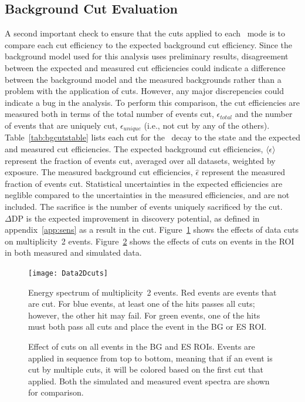 \documentclass[/main.tex]{subfiles}
\begin{document}
\subsection{Background Cut Evaluation}
A second important check to ensure that the cuts applied to each \bbes\ mode is to compare each cut efficiency to the expected background cut efficiency.
Since the background model used for this analysis uses preliminary results, disagreement between the expected and measured cut efficiencies could indicate a difference between the background model and the measured backgrounds rather than a problem with the application of cuts.
However, any major discrepencies could indicate a bug in the analysis.
To perform this comparison, the cut efficiencies are measured both in terms of the total number of events cut, $\epsilon_{total}$ and the number of events that are uniquely cut, $\epsilon_{unique}$ (i.e., not cut by any of the others).
Table~\ref{tab:bgcutstable} lists each cut for the \bbes\ decay to the  state and the expected and measured cut efficiencies.
The expected background cut efficiencies, $\langle\epsilon\rangle$ represent the fraction of events cut, averaged over all datasets, weighted by exposure.
The measured background cut efficiencies, $\hat{\epsilon}$ represent the measured fraction of events cut.
Statistical uncertainties in the expected efficiencies are neglible compared to the uncertainties in the measured efficiencies, and are not included.
The sacrifice is the number of events uniquely sacrificed by the cut.
$\Delta \mathrm{DP}$ is the expected improvement in discovery potential, as defined in appendix~\ref{app:sens} as a result in the cut.
Figure~\ref{fig:datacuts2D} shows the effects of data cuts on multiplicity~2 events.
Figure~\ref{fig:cutsroi} shows the effects of cuts on events in the ROI in both measured and simulated data.

\begin{figure}
  \centering
  \texttt{[image: Data2Dcuts]}
  \caption[Effect of data cuts on measured multiplicity 2 events]{\label{fig:datacuts2D}
    Energy spectrum of multiplicity~2 events. Red events are events that are cut. For blue events, at least one of the hits passes all cuts; however, the other hit may fail. For green events, one of the hits must both pass all cuts and place the event in the BG or ES ROI.
  }
\end{figure}

\begin{figure}
  \centering
  \caption[Effect of data cuts on ROI events in measured and simulated data]{\label{fig:cutsroi}
    Effect of cuts on all events in the BG and ES ROIs. Events are applied in sequence from top to bottom, meaning that if an event is cut by multiple cuts, it will be colored based on the first cut that applied. Both the simulated and measured event spectra are shown for comparison.
  }
\end{figure}
\end{document}
